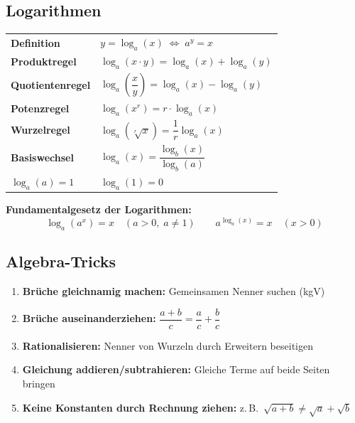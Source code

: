 \documentclass[../zusammenfassung_AN.tex]{subfiles}
\begin{document}
	\subsection{Logarithmen}
	
	\begin{tcolorbox}[dglbox, title={Logarithmengesetze}]
		\renewcommand{\arraystretch}{1.6}
		\begin{tabular}{ll}
			\textbf{Definition}       & $y = \log_a(x) \;\Leftrightarrow\; a^y = x$ \\
			\textbf{Produktregel}     & $\log_a(x\cdot y) = \log_a(x) + \log_a(y)$ \\
			\textbf{Quotientenregel}  & $\log_a\!\left(\dfrac{x}{y}\right) = \log_a(x) - \log_a(y)$ \\[6pt]
			\textbf{Potenzregel}      & $\log_a(x^r) = r\cdot\log_a(x)$ \\
			\textbf{Wurzelregel}      & $\log_a(\sqrt[r]{x}) = \dfrac{1}{r}\log_a(x)$ \\[6pt]
			\textbf{Basiswechsel}     & $\log_a(x) = \dfrac{\log_b(x)}{\log_b(a)}$ \\[6pt]
			$\log_a(a)=1$             & $\log_a(1) = 0$ \\
		\end{tabular}
	\end{tcolorbox}
	
	\begin{tcolorbox}[formelbox]
		\textbf{Fundamentalgesetz der Logarithmen:}
		\[
		\log_a(a^x) = x \quad (a>0,\; a\neq 1)
		\qquad
		a^{\log_a(x)} = x \quad (x>0)
		\]
	\end{tcolorbox}
	
	\subsection{Algebra-Tricks}
	
	\begin{tcolorbox}[hinweis]
		\begin{enumerate}[noitemsep]
			\item \textbf{Brüche gleichnamig machen:} Gemeinsamen Nenner suchen (kgV)
			\item \textbf{Brüche auseinanderziehen:} $\dfrac{a+b}{c} = \dfrac{a}{c} + \dfrac{b}{c}$
			\item \textbf{Rationalisieren:} Nenner von Wurzeln durch Erweitern beseitigen
			\item \textbf{Gleichung addieren/subtrahieren:} Gleiche Terme auf beide Seiten bringen
			\item \textbf{Keine Konstanten durch Rechnung ziehen:} z.\,B.\ $\sqrt{a+b} \neq \sqrt{a}+\sqrt{b}$
		\end{enumerate}
	\end{tcolorbox}
	
\end{document}
